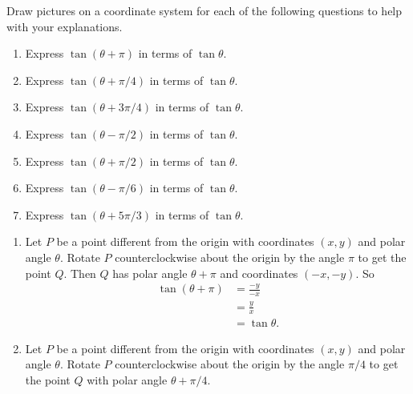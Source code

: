 \documentclass{ximera}
\begin{document}
\begin{question} \label{QzmnnNNN}
Draw pictures on a coordinate system for each of the following questions to help with your explanations.
\begin{enumerate}
\item Express $\tan(\theta + \pi)$ in terms of $\tan\theta$. 

\item  Express $\tan(\theta + \pi/4)$ in terms of $\tan\theta$.

\item  Express $\tan(\theta + 3\pi/4)$ in terms of $\tan\theta$.

\item Express $\tan(\theta - \pi/2)$ in terms of $\tan\theta$.

\item Express $\tan(\theta + \pi/2)$ in terms of $\tan\theta$.

\item Express $\tan(\theta - \pi/6)$ in terms of $\tan\theta$.

\item Express $\tan(\theta + 5\pi/3)$ in terms of $\tan\theta$.
\end{enumerate}

\begin{explanation}
\begin{enumerate}
\item Let $P$ be a point different from the origin with coordinates $(x,y)$ and polar angle $\theta$. Rotate $P$ counterclockwise  about the origin by the angle $\pi$ to get the point $Q$. Then $Q$ has polar angle $\theta + \pi$ and coordinates $(-x,-y)$. So
\begin{align*}
 \tan (\theta + \pi) &= \frac{-y}{-x} \\
                            &= \frac{y}{x} \\
                            &= \tan \theta .
\end{align*}

\item Let $P$ be a point different from the origin with coordinates $(x,y)$ and polar angle $\theta$. Rotate  $P$ counterclockwise about the origin by the angle $\pi/4$ to get the point $Q$ with polar angle $\theta + \pi/4$.


\end{enumerate}
\end{explanation}
\end{question}
\end{document}
